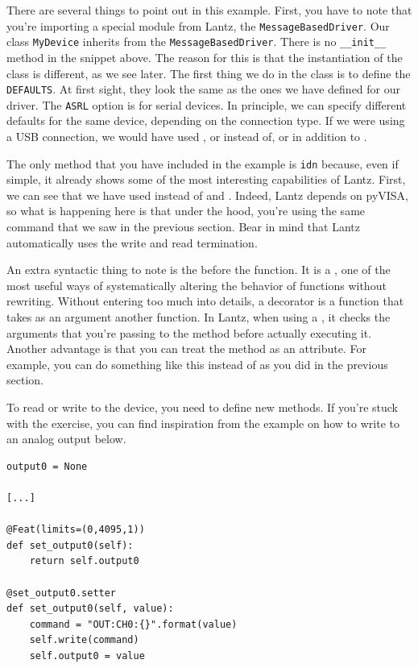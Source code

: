 There are several things to point out in this example. First, you have to note that you're importing a special module from Lantz, the \texttt{MessageBasedDriver}. Our class \texttt{MyDevice} inherits from the \texttt{MessageBasedDriver}. There is no \texttt{__init__} method in the snippet above. The reason for this is that the instantiation of the class is different, as we see later. The first thing we do in the class is to define the \texttt{DEFAULTS}. At first sight, they look the same as the ones we have defined for our driver. The \texttt{ASRL} option is for serial devices. In principle, we can specify different defaults for the same device, depending on the connection type. If we were using a {USB} connection, we would have used , or  instead of, or in addition to .

The only method that you have included in the example is \texttt{idn} because, even if simple, it already shows some of the most interesting capabilities of Lantz. First, we can see that we have used  instead of  and . Indeed, Lantz depends on pyVISA, so what is happening here is that under the hood, you're using the same command that we saw in the previous section. Bear in mind that Lantz automatically uses the write and read termination.

An extra syntactic thing to note is the  before the function. It is a , one of the most useful ways of systematically altering the behavior of functions without rewriting. Without entering too much into details, a decorator is a function that takes as an argument another function. In Lantz, when using a , it checks the arguments that you're passing to the method before actually executing it. Another advantage is that you can treat the method as an attribute. For example, you can do something like this  instead of  as you did in the previous section.


To read or write to the device, you need to define new methods. If you're stuck with the exercise, you can find inspiration from the example on how to write to an analog output below.

\begin{verbatim}
output0 = None

[...]

@Feat(limits=(0,4095,1))
def set_output0(self):
    return self.output0

@set_output0.setter
def set_output0(self, value):
    command = "OUT:CH0:{}".format(value)
    self.write(command)
    self.output0 = value
\end{verbatim}

